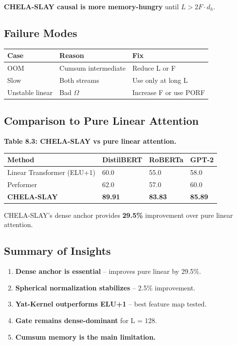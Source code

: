 \textbf{CHELA-SLAY causal is more memory-hungry} until $L > 2F \cdot d_h$.

\subsection{Failure Modes}

\begin{table}[H]
\centering
\small
\begin{tabular}{lll}
\toprule
\textbf{Case} & \textbf{Reason} & \textbf{Fix} \\
\midrule
OOM & Cumsum intermediate & Reduce L or F \\
Slow & Both streams & Use only at long L \\
Unstable linear & Bad $\Omega$ & Increase F or use PORF \\
\bottomrule
\end{tabular}
\end{table}

\subsection{Comparison to Pure Linear Attention}

\textbf{Table 8.3: CHELA-SLAY vs pure linear attention.}

\begin{table}[H]
\centering
\small
\begin{tabular}{llll}
\toprule
\textbf{Method} & \textbf{DistilBERT} & \textbf{RoBERTa} & \textbf{GPT-2} \\
\midrule
Linear Transformer (ELU+1) & 60.0 & 55.0 & 58.0 \\
Performer & 62.0 & 57.0 & 60.0 \\
\textbf{CHELA-SLAY} & \textbf{89.91} & \textbf{83.83} & \textbf{85.89} \\
\bottomrule
\end{tabular}
\end{table}

CHELA-SLAY's dense anchor provides \textbf{29.5\%} improvement over 
pure linear attention.

\subsection{Summary of Insights}

\begin{enumerate}
\item \textbf{Dense anchor is essential} -- improves pure linear by 29.5\%.
\item \textbf{Spherical normalization stabilizes} -- 2.5\% improvement.
\item \textbf{Yat-Kernel outperforms ELU+1} -- best feature map tested.
\item \textbf{Gate remains dense-dominant} for L = 128.
\item \textbf{Cumsum memory is the main limitation.}

\end{enumerate}


